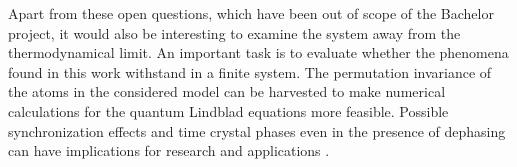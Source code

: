 Apart from these open questions, which have been out of scope of the Bachelor project, it would also be interesting to examine the system away from the thermodynamical limit. An important task is to evaluate whether the phenomena found in this work withstand in a finite system. The permutation invariance of the atoms in the considered model can be harvested to make numerical calculations for the quantum Lindblad equations more feasible. Possible synchronization effects and time crystal phases even in the presence of dephasing can have implications for research and applications \cite{nande_integrating_2025}.

